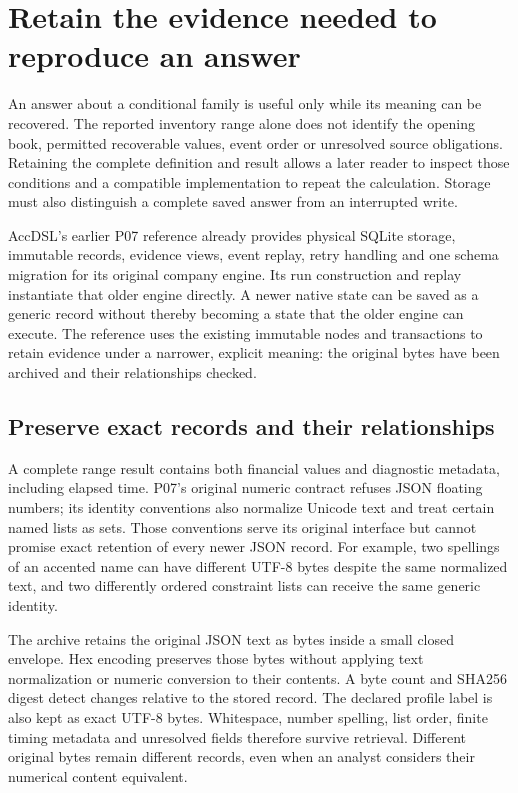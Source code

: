 \section{Retain the evidence needed to reproduce an answer}
\label{sec:simulator-evidence-archive}

An answer about a conditional family is useful only while its meaning can be
recovered. The reported inventory range alone does not identify the opening
book, permitted recoverable values, event order or unresolved source obligations.
Retaining the complete definition and result allows a later reader to inspect
those conditions and a compatible implementation to repeat the calculation.
Storage must also distinguish a complete saved answer from an interrupted write.

AccDSL's earlier P07 reference already provides physical SQLite storage,
immutable records, evidence views, event replay, retry handling and one schema
migration for its original company engine. Its run construction and replay
instantiate that older engine directly. A newer native state can be saved as a
generic record without thereby becoming a state that the older engine can
execute. The  reference uses the existing
immutable nodes and transactions to retain evidence under a narrower, explicit
meaning: the original bytes have been archived and their relationships checked.

\subsection{Preserve exact records and their relationships}

A complete range result contains both financial values and diagnostic metadata,
including elapsed time. P07's original numeric contract refuses JSON floating
numbers; its identity conventions also normalize Unicode text and treat certain
named lists as sets. Those conventions serve its original interface but cannot
promise exact retention of every newer JSON record. For example, two spellings
of an accented name can have different UTF-8 bytes despite the same normalized
text, and two differently ordered constraint lists can receive the same generic
identity.

The archive retains the original JSON text as bytes inside a small closed
envelope. Hex encoding preserves those bytes without applying text normalization
or numeric conversion to their contents. A byte count and SHA256 digest detect
changes relative to the stored record. The declared profile label is also kept
as exact UTF-8 bytes. Whitespace, number spelling, list order, finite timing
metadata and unresolved fields therefore survive retrieval. Different original
bytes remain different records, even when an analyst considers their numerical
content equivalent.

